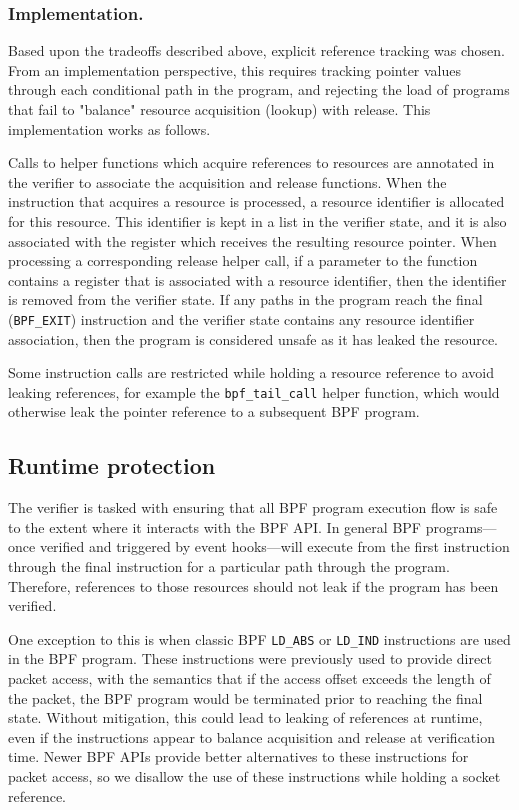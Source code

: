 \documentclass[10pt,sigconf,authorversion]{lpc}
\begin{document}
\subsubsection{Implementation.}

Based upon the tradeoffs described above, explicit reference tracking was
chosen. From an implementation perspective, this requires tracking pointer
values through each conditional path in the program, and rejecting the load of
programs that fail to "balance" resource acquisition (lookup) with release.
This implementation works as follows.

Calls to helper functions which acquire references to resources are annotated
in the verifier to associate the acquisition and release functions. When the
instruction that acquires a resource is processed, a resource identifier is
allocated for this resource. This identifier is kept in a list in the verifier
state, and it is also associated with the register which receives the resulting
resource pointer. When processing a corresponding release helper call, if a
parameter to the function contains a register that is associated with a
resource identifier, then the identifier is removed from the verifier state. If
any paths in the program reach the final (\verb+BPF_EXIT+) instruction and the
verifier state contains any resource identifier association, then the program
is considered unsafe as it has leaked the resource.

Some instruction calls are restricted while holding a resource reference to
avoid leaking references, for example the \verb+bpf_tail_call+ helper function,
which would otherwise leak the pointer reference to a subsequent BPF program.

\subsection{Runtime protection}

The verifier is tasked with ensuring that all BPF program execution flow is
safe to the extent where it interacts with the BPF API. In general BPF
programs---once verified and triggered by event hooks---will execute from the
first instruction through the final instruction for a particular path through
the program. Therefore, references to those resources should not leak if the
program has been verified.

One exception to this is when classic BPF \verb+LD_ABS+ or \verb+LD_IND+
instructions are used in the BPF program. These instructions were previously
used to provide direct packet access, with the semantics that if the access
offset exceeds the length of the packet, the BPF program would be terminated
prior to reaching the final state. Without mitigation, this could lead to
leaking of references at runtime, even if the instructions appear to balance
acquisition and release at verification time. Newer BPF APIs provide better
alternatives to these instructions for packet access, so we disallow the use of
these instructions while holding a socket reference.
\end{document}
